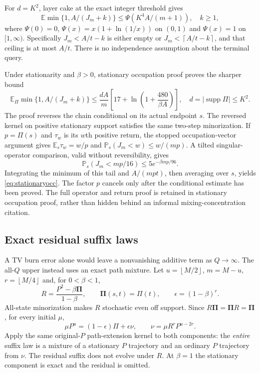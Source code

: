 \documentclass[11pt,letterpaper]{article}
\theoremstyle{definition}\newtheorem{definition}[theorem]{Definition}
\theoremstyle{remark}\newtheorem{remark}[theorem]{Remark}
\newcommand{\E}{\mathbb{E}}
\newcommand{\Prob}{\mathbb{P}}
\newcommand{\floor}[1]{\left\lfloor #1\right\rfloor}
\newcommand{\ceil}[1]{\left\lceil #1\right\rceil}
\newcommand{\supp}{\operatorname{supp}}
\begin{document}
For $d=K^2$, layer cake at the exact integer threshold gives
\begin{equation}\label{eq:psi}
 \E\min\{1,A/(J_m+k)\}\le\Psi(K^4A/(m+1)),\quad k\ge1,
\end{equation}
where $\Psi(0)=0$, $\Psi(x)=x(1+\ln(1/x))$ on $(0,1)$ and $\Psi(x)=1$ on $[1,\infty)$. Specifically $J_m<A/t-k$ is either empty or $J_m<\ceil{A/t-k}$, and that ceiling is at most $A/t$. There is no independence assumption about the terminal query.

Under stationarity and $\beta>0$, stationary occupation proof proves the sharper bound
\begin{equation}\label{eq:stationaryocc}
 \E_\Pi\min\{1,A/(J_m+k)\}
 \le\frac{dA}{m}\left[17+\ln\left(1+\frac{480}{\beta A}\right)\right],
 \quad d=|\supp\Pi|\le K^2.
\end{equation}
The proof reverses the chain conditional on its actual endpoint $s$. The reversed kernel on positive stationary support satisfies the same two-step minorization. If $p=\Pi(s)$ and $\tau_w$ is its $w$th positive return, the stopped occupation-vector argument gives $\E_s\tau_w=w/p$ and $\Prob_s(J_m<w)\le w/(mp)$. A tilted singular-operator comparison, valid without reversibility, gives
\[
 \Prob_s(J_m<mp/16)\le5e^{-\beta mp/96}.
\]
Integrating the minimum of this tail and $A/(mpt)$, then averaging over $s$, yields \eqref{eq:stationaryocc}. The factor $p$ cancels only after the conditional estimate has been proved. The full operator and return proof is retained in stationary occupation proof, rather than hidden behind an informal mixing-concentration citation.

\subsection{Exact residual suffix laws}
A TV burn error alone would leave a nonvanishing additive term as $Q\to\infty$. The all-$Q$ upper instead uses an exact path mixture. Let $u=\floor{M/2}$, $m=M-u$, $r=\floor{M/4}$ and, for $0<\beta<1$,
\[
 R=\frac{P^2-\beta\mathbf\Pi}{1-\beta},\qquad
 \mathbf\Pi(s,t)=\Pi(t),\qquad \epsilon=(1-\beta)^r.
\]
All-state minorization makes $R$ stochastic even off support. Since $R\mathbf\Pi=\mathbf\Pi R=\mathbf\Pi$, for every initial $\mu$,
\begin{equation}\label{eq:mixture}
 \mu P^u=(1-\epsilon)\Pi+\epsilon\nu,
 \qquad \nu=\mu R^rP^{u-2r}.
\end{equation}
Apply the same original-$P$ path-extension kernel to both components: the \emph{entire} suffix law is a mixture of a stationary $P$ trajectory and an ordinary $P$ trajectory from $\nu$. The residual suffix does not evolve under $R$. At $\beta=1$ the stationary component is exact and the residual is omitted.
\end{document}
